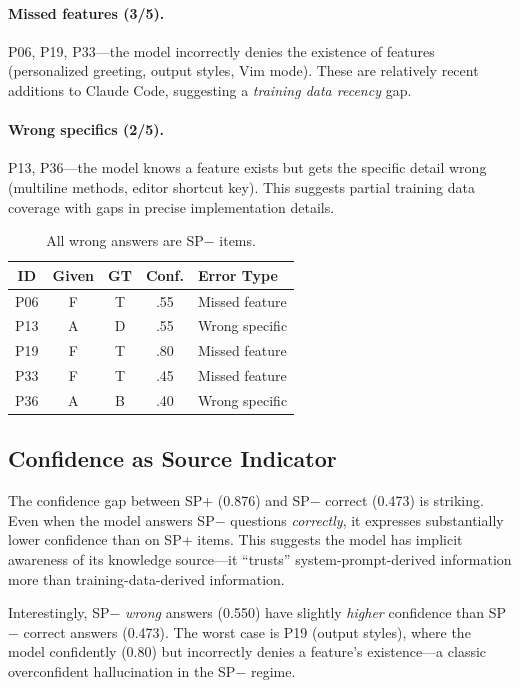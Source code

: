\documentclass[10pt,twocolumn]{article}
\begin{document}
\paragraph{Missed features (3/5).}
P06, P19, P33---the model incorrectly denies the existence of features (personalized greeting, output styles, Vim mode).
These are relatively recent additions to Claude Code, suggesting a \textit{training data recency} gap.

\paragraph{Wrong specifics (2/5).}
P13, P36---the model knows a feature exists but gets the specific detail wrong (multiline methods, editor shortcut key).
This suggests partial training data coverage with gaps in precise implementation details.

\begin{table}[t]
\centering
\caption{All wrong answers are SP$-$ items.}
\label{tab:errors}
\small
\begin{tabular}{@{}ccccl@{}}
\toprule
\textbf{ID} & \textbf{Given} & \textbf{GT} & \textbf{Conf.} & \textbf{Error Type} \\
\midrule
P06 & F & T & .55 & Missed feature \\
P13 & A & D & .55 & Wrong specific \\
P19 & F & T & .80 & Missed feature \\
P33 & F & T & .45 & Missed feature \\
P36 & A & B & .40 & Wrong specific \\
\bottomrule
\end{tabular}
\end{table}

\subsection{Confidence as Source Indicator}

The confidence gap between SP+ (0.876) and SP$-$ correct (0.473) is striking.
Even when the model answers SP$-$ questions \textit{correctly}, it expresses substantially lower confidence than on SP+ items.
This suggests the model has implicit awareness of its knowledge source---it ``trusts'' system-prompt-derived information more than training-data-derived information.

Interestingly, SP$-$ \textit{wrong} answers (0.550) have slightly \textit{higher} confidence than SP$-$ correct answers (0.473).
The worst case is P19 (output styles), where the model confidently (0.80) but incorrectly denies a feature's existence---a classic overconfident hallucination in the SP$-$ regime.
\end{document}

